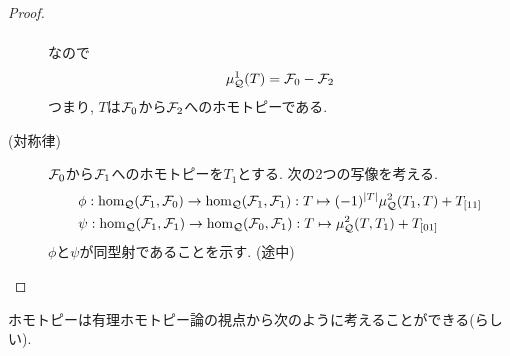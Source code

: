\documentclass[uplatex, a4paper, 14Q, dvipdfmx]{jsarticle}
\begin{document}
\begin{proof}
\begin{description}
\begin{align*}
    \end{align*}
    なので
    \begin{align*}
      \mu^1_{\mathcal{Q}}(T)
      = \mathcal{F}_0 -\mathcal{F}_2
    \end{align*}
    つまり, $T$は$\mathcal{F}_0$から$\mathcal{F}_2$へのホモトピーである. 
    \item[(対称律)] $\mathcal{F}_0$から$\mathcal{F}_1$へのホモトピーを$T_1$とする. 
    次の2つの写像を考える. 
    \begin{align*}
      &\phi : \hom_{\mathcal{Q}}(\mathcal{F}_1,\mathcal{F}_0) \to \hom_{\mathcal{Q}}(\mathcal{F}_1,\mathcal{F}_1) : T \mapsto (-1)^{|T|} \mu^2_{\mathcal{Q}}(T_1,T) + T_{[11]} \\
      &\psi : \hom_{\mathcal{Q}}(\mathcal{F}_1,\mathcal{F}_1) \to \hom_{\mathcal{Q}}(\mathcal{F}_0,\mathcal{F}_1) : T \mapsto \mu^2_{\mathcal{Q}}(T,T_1) + T_{[01]}
    \end{align*}
    $\phi$と$\psi$が同型射であることを示す. (途中)
  \end{description}
\end{proof}

\begin{definition}
  
\end{definition}

ホモトピーは有理ホモトピー論の視点から次のように考えることができる(らしい).
\end{document}
